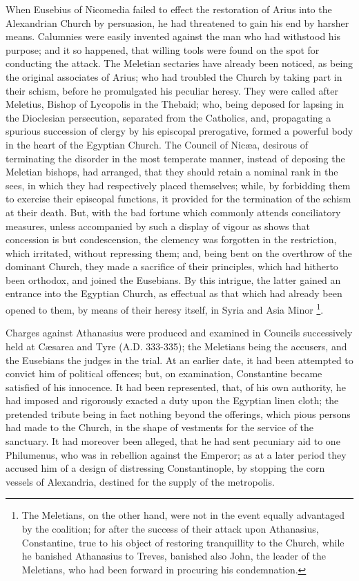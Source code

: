 When Eusebius of Nicomedia failed to effect the restoration of
Arius into the Alexandrian Church by persuasion, he had threatened to
gain his end by harsher means. Calumnies were easily invented against
the man who had withstood his purpose; and it so happened, that
willing tools were found on the spot for conducting the attack. The
Meletian sectaries have already been noticed, as being the original
associates of Arius; who had troubled the Church by taking part in
their schism, before he promulgated his peculiar heresy. They were
called after Meletius, Bishop of Lycopolis in the Thebaid; who, being
deposed for lapsing in the Dioclesian persecution, separated from the
Catholics, and, propagating a spurious succession of clergy by his
episcopal prerogative, formed a powerful body in the heart of the
Egyptian Church. The Council of Nicæa, desirous of terminating the
disorder in the most temperate manner, instead of deposing the
Meletian bishops, had arranged, that they should retain a nominal rank
in the sees, in which they had respectively placed themselves; while,
by forbidding them to exercise their episcopal functions, it provided
for the termination of the schism at their death. But, with the bad
fortune which commonly attends conciliatory measures, unless
accompanied by such a display of vigour as shows that concession is
but condescension, the clemency was forgotten in the restriction,
which irritated, without repressing them; and, being bent on the
overthrow of the dominant Church, they made a sacrifice of their
principles, which had hitherto been orthodox, and joined the Eusebians.
By this intrigue, the latter gained an entrance into the Egyptian
Church, as effectual as that which had already been opened to them, by
means of their heresy itself, in Syria and Asia Minor \footnote{The Meletians, on the other hand, were not
in the event equally advantaged by the coalition; for after the
success of their attack upon Athanasius, Constantine, true to his
object of restoring tranquillity to the Church, while he banished
Athanasius to Treves, banished also John, the leader of the Meletians,
who had been forward in procuring his condemnation.}.

Charges against Athanasius were produced and examined in Councils
successively held at Cæsarea and Tyre (A.D.
333-335); the Meletians being the accusers, and the Eusebians the
judges in the trial. At an earlier date, it had been attempted to
convict him of political offences; but, on examination, Constantine
became satisfied of his innocence. It had been represented, that, of
his own authority, he had imposed and rigorously exacted a duty upon
the Egyptian linen cloth; the pretended tribute being in fact nothing
beyond the offerings, which pious persons had made to the Church, in
the shape of vestments for the service of the sanctuary. It had
moreover been alleged, that he had sent pecuniary aid to one
Philumenus, who was in rebellion against the Emperor; as at a later
period they accused him of a design of distressing Constantinople, by
stopping the corn vessels of Alexandria, destined for the supply of
the metropolis.

